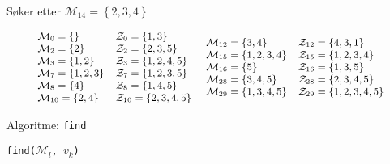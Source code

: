 \documentclass{beamer}
\begin{document}
\begin{frame}{Søker etter $\mathcal{M}_{14} = \left\{  2,3,4 \right\}$}
\begin{center}

\[
\small
    \begin{array}{ll}
        \mathcal{M}_0    = \left\{{}\right\}           & \mathcal{Z}_0    = \left\{{1,3}\right\} \\
        \mathcal{M}_2    = \left\{{2}\right\}          & \mathcal{Z}_2    = \left\{{2,3,5}\right\} \\
        \mathcal{M}_3    = \left\{{1,2}\right\}        & \mathcal{Z}_3    = \left\{{1,2,4,5}\right\} \\
        \mathcal{M}_7    = \left\{{1,2,3}\right\}      & \mathcal{Z}_7    = \left\{{1,2,3,5}\right\} \\
        \mathcal{M}_8    = \left\{{4}\right\}          & \mathcal{Z}_8    = \left\{{1,4,5}\right\} \\
        \mathcal{M}_{10} = \left\{{2,4}\right\}        & \mathcal{Z}_{10} = \left\{{2,3,4,5}\right\}
    \end{array}
~
    \begin{array}{ll}
        \mathcal{M}_{12} = \left\{{3,4}\right\}        & \mathcal{Z}_{12} = \left\{{4,3,1}\right\} \\
        \mathcal{M}_{15} = \left\{{1,2,3,4}\right\}    & \mathcal{Z}_{15} = \left\{{1,2,3,4}\right\} \\
        \mathcal{M}_{16} = \left\{{5}\right\}          & \mathcal{Z}_{16} = \left\{{1,3,5}\right\} \\
        \mathcal{M}_{28} = \left\{{3,4,5}\right\}      & \mathcal{Z}_{28} = \left\{{2,3,4,5}\right\} \\
        \mathcal{M}_{29} = \left\{{1,3,4,5}\right\}    & \mathcal{Z}_{29} = \left\{{1,2,3,4,5}\right\}
    \end{array}
\]
\end{center}
\end{frame}



\begin{frame}{Algoritme: \texttt{find}}
\begin{algorithm}[H]
\caption{\texttt{find($\mathcal{M}_l$, $v_k$)}}
\label{alg:find}

\end{algorithm}
\end{frame}
\end{document}
